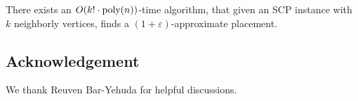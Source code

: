 \documentclass[runningheads]{llncs}
\newcommand{\eps}{\varepsilon}
\newcommand{\scp}{\textsc{SCP}\xspace}
\begin{document}
\begin{theorem}
There exists an $O(k! \cdot \text{\rm poly}(n))$-time algorithm, that
given an \scp instance with $k$ neighborly vertices, finds a
$(1+\eps)$-approximate placement.
\end{theorem}
%










\subsection*{Acknowledgement}

We thank Reuven Bar-Yehuda for helpful discussions.





\end{document}
